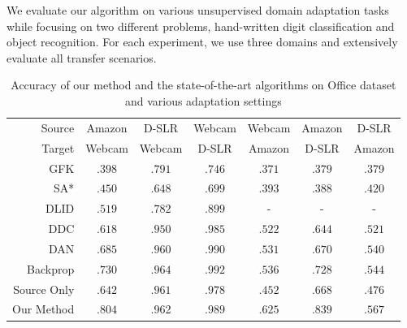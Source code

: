We evaluate our algorithm on various unsupervised domain adaptation tasks while focusing on two different problems, hand-written digit classification and object recognition. For each experiment, we use three domains and extensively evaluate all transfer scenarios.

\begin{table}[ht]
\caption{Accuracy of our method and the state-of-the-art algorithms on Office dataset and various adaptation settings}
\label{tab:res}
\begin{sc}
\begin{center}
\begin{small}
\begin{tabular}{@{}rcccccc@{}} \toprule 
 Source & Amazon & D-SLR & Webcam & Webcam &Amazon & D-SLR \\
 Target & Webcam & Webcam & D-SLR & Amazon & D-SLR & Amazon \\
 \midrule
GFK \cite{gong2012} & $.398$ & $.791$ & $.746 $ & $.371$ & $.379$ & .379   \\
SA* \cite{fernando13} & $.450$ & $.648$ & $.699$ & $.393$ & $.388$ & $.420$ \\
DLID \cite{chopra13} & $.519$ & $.782$ & $.899$ & -&- &- \\
DDC \cite{tzeng14} & $.618$ & $.950$ & $.985$ & $.522$ & $.644$& $.521$\\
DAN \cite{wang15} & $.685$ & $.960$ & $.990$ & $.531$ & $.670$ & $.540$ \\
Backprop \cite{ganin15} & $.730$ &$\mathbf{.964}$ & $\mathbf{.992}$ & $.536$ & $.728$ & $.544$\\
\midrule
Source Only & $.642$ & $.961$ & $.978$ & $.452$ & $.668$ & $.476$ \\
Our Method & $\mathbf{.804}$ &.962 & $.989$ & $\mathbf{.625}$ & $\mathbf{.839}$ & $\mathbf{.567}$ \\
 \bottomrule
\end{tabular}
\end{small}
\end{center}
\end{sc}
\end{table}

